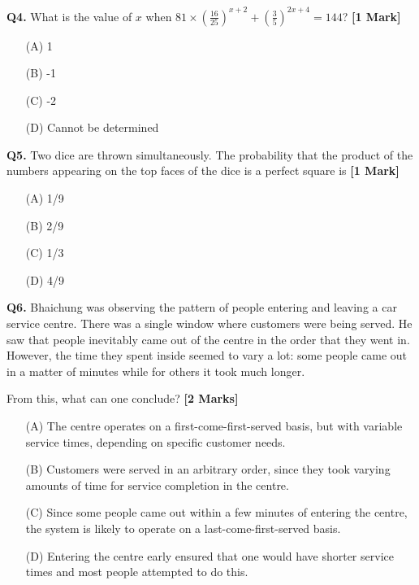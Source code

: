 \documentclass[11pt]{article}
\newcommand{\questiona}[2]{
    \noindent\textbf{Q#2.} #1 \hfill \textbf{[1 Mark]}
}
\newcommand{\questionb}[2]{
    \noindent\textbf{Q#2.} #1 \hfill \textbf{[2 Marks]}
}
\begin{document}
\questiona{What is the value of \( x \) when \( 81 \times \left( \frac{16}{25} \right)^{x+2} + \left( \frac{3}{5} \right)^{2x+4} = 144 \)?}{4}
\begin{enumerate}
    \item[(A)] 1  
    \item[(B)] -1  
    \item[(C)] -2  
    \item[(D)] Cannot be determined  
\end{enumerate}
\vspace{0.5cm}

\questiona{Two dice are thrown simultaneously. The probability that the product of the numbers appearing on the top faces of the dice is a perfect square is}{5}
\begin{enumerate}
    \item[(A)] 1/9  
    \item[(B)] 2/9  
    \item[(C)] 1/3  
    \item[(D)] 4/9  
\end{enumerate}
\vspace{0.5cm}

\questionb{Bhaichung was observing the pattern of people entering and leaving a car service centre. There was a single window where customers were being served. He saw that people inevitably came out of the centre in the order that they went in. However, the time they spent inside seemed to vary a lot: some people came out in a matter of minutes while for others it took much longer.

From this, what can one conclude?}{6}
\begin{enumerate}
    \item[(A)] The centre operates on a first-come-first-served basis, but with variable service times, depending on specific customer needs.  
    \item[(B)] Customers were served in an arbitrary order, since they took varying amounts of time for service completion in the centre.  
    \item[(C)] Since some people came out within a few minutes of entering the centre, the system is likely to operate on a last-come-first-served basis.  
    \item[(D)] Entering the centre early ensured that one would have shorter service times and most people attempted to do this.  
\end{enumerate}
\vspace{0.5cm}
\end{document}

